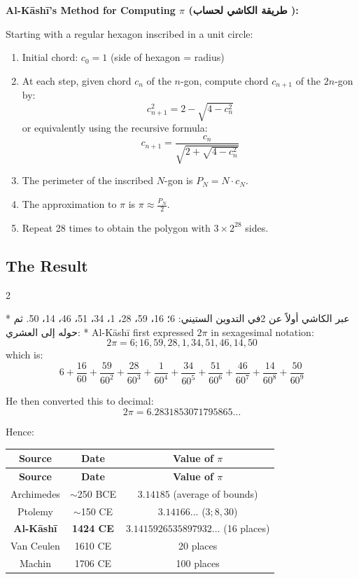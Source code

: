 \documentclass[11pt,a4paper]{article}
\newcommand{\ar}[1]{\arabicfont\beginR #1\endR}
\newenvironment{bilingual}{%
  \vspace{0.3em}%
  \begin{paracol}{2}%
}{%
  \end{paracol}%
  \vspace{0.3em}%
}
\newenvironment{mathalgo}{%
  \par\vspace{0.3cm}
  \begin{framed}
  \setlength{\parindent}{0pt}
}{%
  \end{framed}
  \par\vspace{0.3cm}
}
\begin{document}
\begin{mathalgo}
\textbf{Al-K\=ash\=i's Method for Computing $\pi$ (\ar{طريقة الكاشي لحساب \pi}):}

Starting with a regular hexagon inscribed in a unit circle:
\begin{enumerate}[nosep]
  \item Initial chord: $c_0 = 1$ (side of hexagon = radius)
  \item At each step, given chord $c_n$ of the $n$-gon, compute chord
  $c_{n+1}$ of the $2n$-gon by:
    \[
    c_{n+1}^2 = 2 - \sqrt{4 - c_n^2}
    \]
  or equivalently using the recursive formula:
    \[
    c_{n+1} = \frac{c_n}{\sqrt{2 + \sqrt{4 - c_n^2}}}
    \]
  \item The perimeter of the inscribed $N$-gon is $P_N = N \cdot c_N$.
  \item The approximation to $\pi$ is $\pi \approx \frac{P_N}{2}$.
  \item Repeat 28 times to obtain the polygon with $3 \times 2^{28}$ sides.
\end{enumerate}
\end{mathalgo}

\subsection{The Result}

\begin{bilingual}
\switchcolumn[0]*
\ar{عبر الكاشي أولاً عن 2\pi في التدوين الستيني: 6؛ 16، 59، 28، 1، 34، 51، 46، 14، 50. ثم حوله إلى العشري:}
\switchcolumn[1]*
Al-K\=ash\=i first expressed $2\pi$ in sexagesimal notation:
\[
2\pi = 6; 16, 59, 28, 1, 34, 51, 46, 14, 50
\]
which is:
\[
6 + \frac{16}{60} + \frac{59}{60^2} + \frac{28}{60^3} + \frac{1}{60^4} +
\frac{34}{60^5} + \frac{51}{60^6} + \frac{46}{60^7} + \frac{14}{60^8} +
\frac{50}{60^9}
\]
\end{bilingual}

\noindent He then converted this to decimal:
\[
2\pi = 6.2831853071795865\ldots
\]

\noindent Hence:
\begin{center}
\fbox{$\pi = 3.1415926535897932\ldots$}
\end{center}

\begin{longtable}{|c|c|c|}
\hline
\textbf{Source} & \textbf{Date} & \textbf{Value of $\pi$} \\
\hline
\endfirsthead
\hline
\textbf{Source} & \textbf{Date} & \textbf{Value of $\pi$} \\
\hline
\endhead
Archimedes & $\sim$250 BCE & $3.14185$ (average of bounds) \\
\hline
Ptolemy & $\sim$150 CE & $3.14166\ldots$ ($3; 8, 30$) \\
\hline
\textbf{Al-K\=ash\=i} & \textbf{1424 CE} & $\mathbf{3.1415926535897932\ldots}$
(16 places) \\
\hline
Van Ceulen & 1610 CE & 20 places \\
\hline
Machin & 1706 CE & 100 places \\
\hline
\end{longtable}
\end{document}
